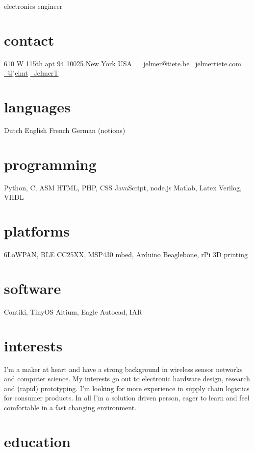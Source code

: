 \documentclass[print]{friggeri-cv}
\begin{document}
       {electronics engineer}


\begin{aside}
  \section{contact}
    610 W 115th apt 94
    10025 New York
    USA
    ~
    \href{mailto:jelmer@tiete.be}{\textcolor{textcolor}{\faEnvelopeAlt}~jelmer@tiete.be}
    \href{http://jelmertiete.com}{\textcolor{textcolor}{\faGlobe}~jelmertiete.com}
    \href{http://twitter.com/jelmt}{\textcolor{textcolor}{\faTwitter}~@jelmt}
    \href{https://github.com/JelmerT}{\textcolor{textcolor}{\faGithub}~JelmerT}
  \section{languages}
    Dutch
    English
    French
    German (notions)
  \section{programming}
    Python, C, ASM
    HTML, PHP, CSS
    JavaScript, node.js
    Matlab, Latex
    Verilog, VHDL
  \section{platforms}
    6LoWPAN, BLE
    CC25XX, MSP430
    mbed, Arduino
    Beaglebone, rPi
    3D printing
  \section{software}
    Contiki, TinyOS
    Altium, Eagle
    Autocad, IAR
\end{aside}

\section{interests}
I'm a maker at heart and have a strong background in wireless sensor networks and computer science. My interests go out to electronic hardware design, research and (rapid) prototyping. I'm looking for more experience in supply chain logistics for consumer products. In all I'm a solution driven person, eager to learn and feel comfortable in a fast changing environment.

\section{education}
\end{document}
